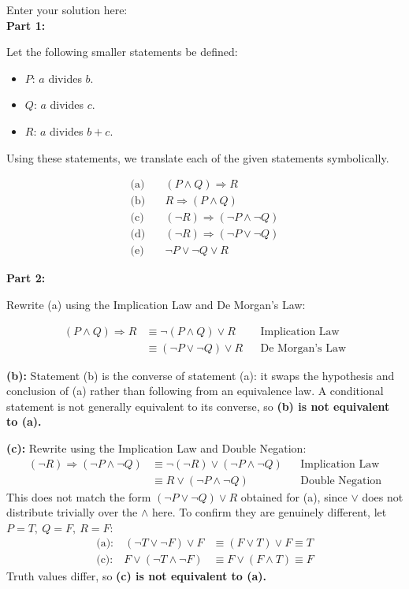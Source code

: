 \documentclass[10pt]{exam}
\begin{document}
\begin{questions}
\begin{solution}
Enter your solution here: \\
\textbf{Part 1:}

Let the following smaller statements be defined:
\begin{itemize}
    \item $P$: $a$ divides $b$.
    \item $Q$: $a$ divides $c$.
    \item $R$: $a$ divides $b+c$.
\end{itemize}

Using these statements, we translate each of the given statements symbolically.

\begin{align*}
\text{(a)} \quad &(P \wedge Q) \Rightarrow R\\
\text{(b)} \quad &R \Rightarrow (P \wedge Q)\\
\text{(c)} \quad &(\neg R) \Rightarrow (\neg P \wedge \neg Q)\\
\text{(d)} \quad &(\neg R) \Rightarrow (\neg P \vee \neg Q)\\
\text{(e)} \quad &\neg P \vee \neg Q \vee R
\end{align*}

\textbf{Part 2:}

Rewrite (a) using the Implication Law and De Morgan's Law:

\begin{align*}
(P \wedge Q) \Rightarrow R
&\equiv \neg(P \wedge Q) \vee R
&& \text{Implication Law}\\
&\equiv (\neg P \vee \neg Q) \vee R
&& \text{De Morgan's Law}
\end{align*}

\textbf{(b):} Statement (b) is the converse of statement (a): it swaps the hypothesis and conclusion of (a) rather than following from an equivalence law. A conditional statement is not generally equivalent to its converse, so \textbf{(b) is not equivalent to (a).}

\textbf{(c):} Rewrite using the Implication Law and Double Negation:
\begin{align*}
(\neg R) \Rightarrow (\neg P \wedge \neg Q)
&\equiv \neg(\neg R) \vee (\neg P \wedge \neg Q)
&& \text{Implication Law}\\
&\equiv R \vee (\neg P \wedge \neg Q)
&& \text{Double Negation}
\end{align*}
This does not match the form $(\neg P \vee \neg Q) \vee R$ obtained for (a), since $\vee$ does not distribute trivially over the $\wedge$ here. To confirm they are genuinely different, let $P = T,\ Q = F,\ R = F$:
\begin{align*}
\text{(a):} \quad (\neg T \vee \neg F) \vee F &\equiv (F \vee T) \vee F \equiv T\\
\text{(c):} \quad F \vee (\neg T \wedge \neg F) &\equiv F \vee (F \wedge T) \equiv F
\end{align*}
Truth values differ, so \textbf{(c) is not equivalent to (a).}


\end{solution}
\end{questions}
\end{document}
